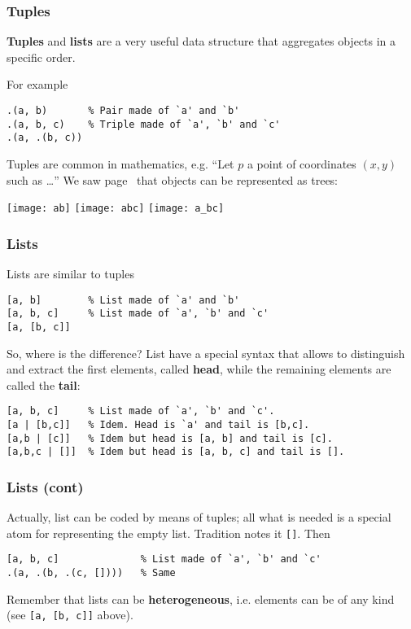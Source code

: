 
%
\begin{frame}[containsverbatim]
\frametitle{Tuples}

\textbf{Tuples} and \textbf{lists} are a very useful data structure
that aggregates objects in a specific order.

\bigskip

For example
{\small
\begin{verbatim}
.(a, b)       % Pair made of `a' and `b'
.(a, b, c)    % Triple made of `a', `b' and `c'
.(a, .(b, c)) 
\end{verbatim}
}
Tuples are common in mathematics, e.g. ``Let \(p\) a point of
coordinates \((x, y)\) such as \dots'' We saw
page~\pageref{structures_as_trees} that \Prolog objects can be
represented as trees:
\begin{center}
\texttt{[image: ab]}
\hspace{1cm}
\texttt{[image: abc]}
\hspace{1cm}
\texttt{[image: a\_bc]}
\end{center}

\end{frame}

%
\begin{frame}[containsverbatim]
\frametitle{Lists}

Lists are similar to tuples
{\small
\begin{verbatim}
[a, b]        % List made of `a' and `b'
[a, b, c]     % List made of `a', `b' and `c'
[a, [b, c]]
\end{verbatim}
}
\bigskip

So, where is the difference? List have a special syntax that allows
to distinguish and extract the first elements, called \textbf{head},
while the remaining elements are called the \textbf{tail}:
{\small
\begin{verbatim}
[a, b, c]     % List made of `a', `b' and `c'.
[a | [b,c]]   % Idem. Head is `a' and tail is [b,c].
[a,b | [c]]   % Idem but head is [a, b] and tail is [c].
[a,b,c | []]  % Idem but head is [a, b, c] and tail is [].
\end{verbatim}
}

\end{frame}

%
\begin{frame}[containsverbatim]
\frametitle{Lists (cont)}

Actually, list can be coded by means of tuples; all what is needed is
a special atom for representing the empty list. Tradition notes it
\texttt{[]}. Then
{\small
\begin{verbatim}
[a, b, c]              % List made of `a', `b' and `c'
.(a, .(b, .(c, [])))   % Same
\end{verbatim}
} 
Remember that lists can be \textbf{heterogeneous}, i.e. elements can
be of any kind (see \texttt{[a, [b, c]]} above).

\end{frame}

